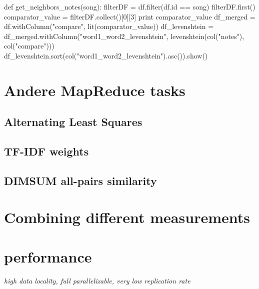 \begin{pythonCode}
def get_neighbors_notes(song):
    filterDF = df.filter(df.id == song)
    filterDF.first()
    comparator_value = filterDF.collect()[0][3] 
    print comparator_value
    df_merged = df.withColumn("compare", lit(comparator_value))
    df_levenshtein = df_merged.withColumn("word1_word2_levenshtein", levenshtein(col("notes"), col("compare")))
    df_levenshtein.sort(col("word1_word2_levenshtein").asc()).show()
\end{pythonCode}

\section{Andere MapReduce tasks}

\subsection{Alternating Least Squares}

\subsection{TF-IDF weights}

\subsection{DIMSUM all-pairs similarity}

\section{Combining different measurements}

\section{performance}

\textit{high data locality, full parallelizable, very low replication rate}


